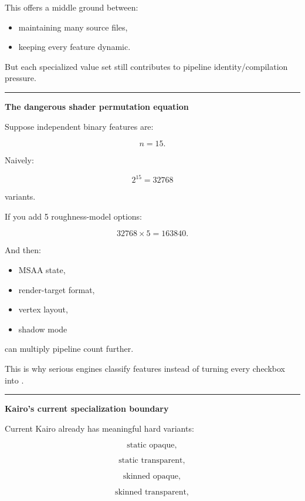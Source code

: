 This offers a middle ground between:

\begin{itemize}
\tightlist
\item
  maintaining many source files,
\item
  keeping every feature dynamic.
\end{itemize}

But each specialized value set still contributes to pipeline identity/compilation pressure.

\begin{center}\rule{0.5\linewidth}{0.5pt}\end{center}

\textbf{The dangerous shader permutation equation}

Suppose independent binary features are:

\[
n=15.
\]

Naively:

\[
2^{15}
=
32768
\]

variants.

If you add 5 roughness-model options:

\[
32768\times5
=
163840.
\]

And then:

\begin{itemize}
\tightlist
\item
  MSAA state,
\item
  render-target format,
\item
  vertex layout,
\item
  shadow mode
\end{itemize}

can multiply pipeline count further.

This is why serious engines classify features instead of turning every checkbox into .

\begin{center}\rule{0.5\linewidth}{0.5pt}\end{center}

\textbf{Kairo's current specialization boundary}

Current Kairo already has meaningful hard variants:

\[
\text{static opaque},
\]

\[
\text{static transparent},
\]

\[
\text{skinned opaque},
\]

\[
\text{skinned transparent},
\]

